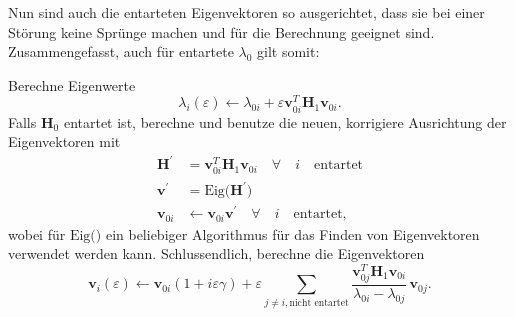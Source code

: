 Nun sind auch die entarteten Eigenvektoren so ausgerichtet, dass sie bei einer Störung keine Sprünge machen und für die Berechnung geeignet sind.
Zusammengefasst, auch für entartete $\lambda_0$ gilt somit:
\begin{ewaufloesung}
Berechne Eigenwerte
\begin{equation*}
    \lambda_i(\varepsilon)
    \gets
    \lambda_{0i} + \varepsilon \bm v_{0i}^T \bm H_1 \bm v_{0i}.
\end{equation*}
Falls $\bm H_0$ entartet ist, berechne und benutze die neuen, korrigiere Ausrichtung der Eigenvektoren mit
\begin{align*}
    \bm H^\prime & = \bm v_{0i}^T \bm H_1 \bm v_{0i} \quad \forall \quad i \quad \text{entartet} \\
    \bm v^\prime & = \mathrm{Eig} \Big( \bm H^\prime \Big) \\
    \bm v_{0i} & \gets \bm v_{0i} \bm v^\prime  \quad \forall \quad i \quad \text{entartet},
\end{align*}
wobei für $\mathrm{Eig} \Big( \Big)$ ein beliebiger Algorithmus für das Finden von Eigenvektoren verwendet werden kann.
Schlussendlich, berechne die Eigenvektoren
\begin{equation*}
    \bm v_i(\varepsilon)
    \gets
    \bm v_{0i} ( 1 + i \varepsilon \gamma ) + \varepsilon \sum_{j \neq i, \text{nicht entartet}}
    \frac{\bm v_{0j}^T \bm H_1 \bm v_{0i}}{\lambda_{0i} - \lambda_{0j}}
    \, \bm v_{0j}.
\end{equation*}
\end{ewaufloesung}
